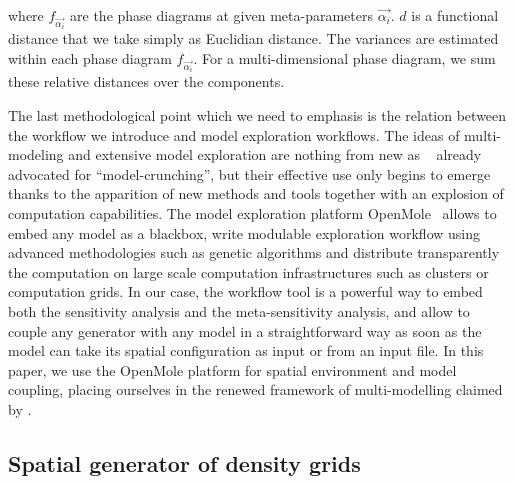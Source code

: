 \documentclass[Royal,sageh,times]{sagej}
\begin{document}
where $f_{\vec{\alpha_i}}$ are the phase diagrams at given meta-parameters $\vec{\alpha_i}$. $d$ is a functional distance that we take simply as Euclidian distance. The variances are estimated within each phase diagram $f_{\vec{\alpha_i}}$. For a multi-dimensional phase diagram, we sum these relative distances over the components. 


The last methodological point which we need to emphasis is the relation between the workflow we introduce and model exploration workflows. The ideas of multi-modeling and extensive model exploration are nothing from new as ~\cite{openshaw1983data} already advocated for ``model-crunching'', but their effective use only begins to emerge thanks to the apparition of new methods and tools together with an explosion of computation capabilities. The model exploration platform OpenMole~\citep{reuillon2013openmole} allows to embed any model as a blackbox, write modulable exploration workflow using advanced methodologies such as genetic algorithms and distribute transparently the computation on large scale computation infrastructures such as clusters or computation grids. In our case, the workflow tool is a powerful way to embed both the sensitivity analysis and the meta-sensitivity analysis, and allow to couple any generator with any model in a straightforward way as soon as the model can take its spatial configuration as input or from an input file. In this paper, we use the OpenMole platform for spatial environment and model coupling, placing ourselves in the renewed framework of multi-modelling claimed by \citet{cottineau2015modular}.
\subsection{Spatial generator of density grids}
\end{document}
